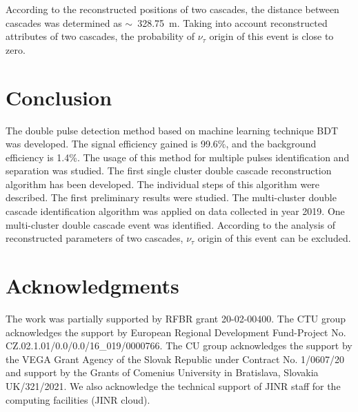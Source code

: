 \documentclass[a4paper,11pt]{article}
\begin{document}
 According to the reconstructed positions of two cascades, the distance between cascades was determined as $\sim$~328.75~m. Taking into account reconstructed attributes of two cascades, the probability of $\nu_{\tau}$ origin of this event is close to zero.




\section{Conclusion}

The double pulse detection method based on machine learning technique BDT was developed. The signal efficiency gained is 99.6\%, and the background efficiency is 1.4\%. The usage of this method for multiple pulses identification and separation was studied.
The first single cluster double cascade reconstruction algorithm has been developed. The individual steps of this algorithm were described. The first preliminary results were studied.
The multi-cluster double cascade identification algorithm was applied on data collected in year 2019. One multi-cluster double cascade event was identified. According to the analysis of reconstructed parameters of two cascades, $\nu_{\tau}$ origin of this event can be excluded. 


\section{Acknowledgments}
The work was partially supported by RFBR grant 20-02-00400. The CTU group acknowledges the support by European Regional Development Fund-Project No. CZ.02.1.01/0.0/0.0/16\_019/0000766. The CU group acknowledges the support by the VEGA Grant Agency of the Slovak Republic under Contract No. 1/0607/20 and support by the  Grants  of  Comenius  University  in  Bratislava, Slovakia UK/321/2021. We also acknowledge the technical support of JINR staff for the computing facilities (JINR cloud).
\end{document}
